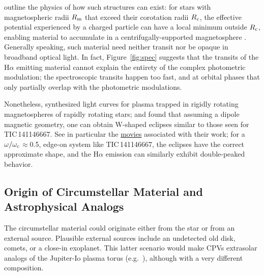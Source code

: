 \documentclass[11pt,twocolumn,tighten,linenumbers]{aastex7}
\begin{document}
\citet{Townsend2005} outline the physics of how such structures can
exist: for stars with magnetospheric radii $R_{\rm m}$ that exceed
their corotation radii $R_{\rm c}$, the effective potential
experienced by a charged particle can have a local minimum outside
$R_{\rm c}$, enabling material to accumulate in a
centrifugally-supported magnetosphere
\citep{Petit2013,Daley-Yates2024}.  Generally speaking, such material
need neither transit nor be opaque in broadband optical light.  In
fact, Figure~\ref{fig:spec} suggests that the transits of the
H$\alpha$ emitting material cannot explain the entirety of the complex
photometric modulation;  the spectroscopic transits happen too fast,
and at orbital phases that only partially overlap with the photometric
modulations.

Nonetheless, \citet{Townsend2008} synthesized light curves for plasma
trapped in rigidly rotating magnetospheres of rapidly rotating stars;
and found that assuming a dipole magnetic geometry, one can obtain
W-shaped eclipses similar to those seen for TIC\,141146667.  See in
particular the
\href{http://user.astro.wisc.edu/~townsend/static.php?ref=rrm-movies#Download_Bundles}{movies}
associated with their work; for a $\omega/\omega_{\rm c}$$\approx$0.5,
edge-on system like TIC\,141146667, the eclipses have the correct
approximate shape, and the H$\alpha$ emission can similarly exhibit
double-peaked behavior.

\subsection{Origin of Circumstellar Material and Astrophysical Analogs}

The circumstellar material could originate either from the star or
from an external source.  Plausible external sources include an
undetected old disk, comets, or a close-in exoplanet.  This latter
scenario would make CPVs extrasolar analogs of the Jupiter-Io plasma
torus (e.g.~\citealt{Bagenal1981}), although with a very different
composition.
\end{document}
